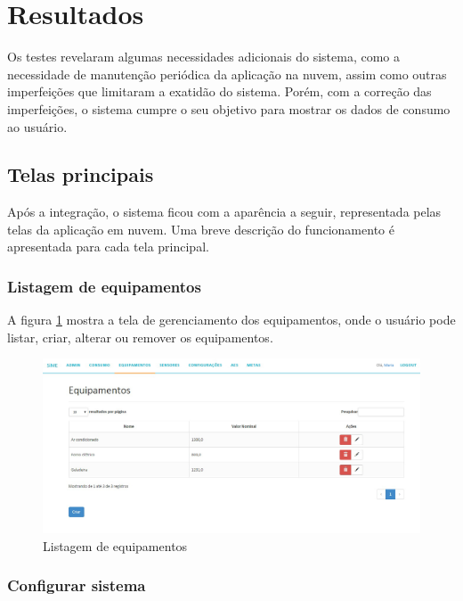 \section{Resultados}
\label{Sec:6-resultados}

Os testes revelaram algumas necessidades adicionais do sistema, como a necessidade de manutenção periódica da aplicação na nuvem, assim como outras imperfeições que limitaram a exatidão do sistema. Porém, com a correção das imperfeições, o sistema cumpre o seu objetivo para mostrar os dados de consumo ao usuário.

\subsection{Telas principais}

Após a integração, o sistema ficou com a aparência a seguir, representada pelas telas da aplicação em nuvem. Uma breve descrição do funcionamento é apresentada para cada tela principal.

\subsubsection{Listagem de equipamentos}

A figura \ref{fig:telas-equipamentos-list} mostra a tela de gerenciamento dos equipamentos, onde o usuário pode listar, criar, alterar ou remover os equipamentos.

\begin{figure}[H]
\centering
\includegraphics[width=1\textwidth]{figuras/equipamentos_list.jpg}
\caption{\label{fig:telas-equipamentos-list} Listagem de equipamentos}
\end{figure}

\subsubsection{Configurar sistema}

